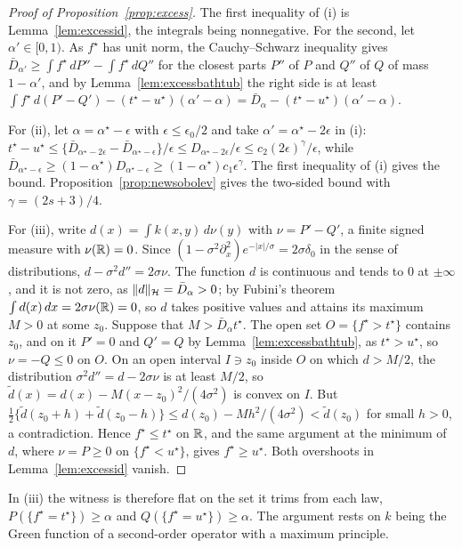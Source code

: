 \begin{proof}[Proof of Proposition~\ref{prop:excess}]
The first inequality of (i) is Lemma~\ref{lem:excessid}, the integrals being nonnegative. For the second, let
$\alpha'\in[0,1)$. As $f^\star$ has unit norm, the Cauchy--Schwarz inequality gives
$\bar D_{\alpha'}\ge\int f^\star\,dP''-\int f^\star\,dQ''$ for the closest parts $P''$ of $P$ and $Q''$ of $Q$ of mass
$1-\alpha'$, and by Lemma~\ref{lem:excessbathtub} the right side is at least
$\int f^\star\,d(P'-Q')-(t^\star-u^\star)(\alpha'-\alpha)=\bar D_\alpha-(t^\star-u^\star)(\alpha'-\alpha)$.

For (ii), let $\alpha=\alpha^\star-\epsilon$ with $\epsilon\le\epsilon_0/2$ and take $\alpha'=\alpha^\star-2\epsilon$ in
(i): $t^\star-u^\star\le\{\bar D_{\alpha^\star-2\epsilon}-\bar D_{\alpha^\star-\epsilon}\}/\epsilon\le
D_{\alpha^\star-2\epsilon}/\epsilon\le c_2(2\epsilon)^\gamma/\epsilon$, while
$\bar D_{\alpha^\star-\epsilon}\ge(1-\alpha^\star)D_{\alpha^\star-\epsilon}\ge(1-\alpha^\star)c_1\epsilon^\gamma$. The first
inequality of (i) gives the bound. Proposition~\ref{prop:newsobolev} gives the two-sided bound with
$\gamma=(2s+3)/4$.

For (iii), write $d(x)=\int k(x,y)\,d\nu(y)$ with $\nu=P'-Q'$, a finite signed measure with $\nu(\mathbb{R})=0$. Since
$(1-\sigma^2\partial_x^2)e^{-|x|/\sigma}=2\sigma\delta_0$ in the sense of distributions, $d-\sigma^2d''=2\sigma\nu$. The function
$d$ is continuous and tends to $0$ at $\pm\infty$, and it is not zero, as $\|d\|_{\mathcal{H}}=\bar D_\alpha>0$; by Fubini's theorem
$\int d(x)\,dx=2\sigma\nu(\mathbb{R})=0$, so $d$ takes positive values and attains its maximum $M>0$ at some $z_0$. Suppose that
$M>\bar D_\alpha t^\star$. The open set $O=\{f^\star>t^\star\}$ contains $z_0$, and on it $P'=0$ and $Q'=Q$ by
Lemma~\ref{lem:excessbathtub}, as $t^\star>u^\star$, so $\nu=-Q\le0$ on $O$. On an open interval $I\ni z_0$ inside $O$
on which $d>M/2$, the distribution $\sigma^2d''=d-2\sigma\nu$ is at least $M/2$, so $\tilde d(x)=d(x)-M(x-z_0)^2/(4\sigma^2)$ is
convex on $I$. But $\frac12\{\tilde d(z_0+h)+\tilde d(z_0-h)\}\le d(z_0)-Mh^2/(4\sigma^2)<\tilde d(z_0)$ for small $h>0$, a contradiction.
Hence $f^\star\le t^\star$ on $\mathbb{R}$, and the same argument at the minimum of $d$, where $\nu=P\ge0$ on
$\{f^\star<u^\star\}$, gives $f^\star\ge u^\star$. Both overshoots in Lemma~\ref{lem:excessid} vanish.
\end{proof}

In (iii) the witness is therefore flat on the set it trims from each law, $P(\{f^\star=t^\star\})\ge\alpha$ and
$Q(\{f^\star=u^\star\})\ge\alpha$. The argument rests on $k$ being the Green function of a second-order operator with a
maximum principle.

